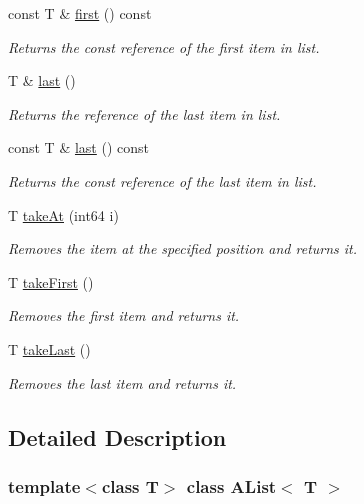 \begin{DoxyCompactItemize}
const T \& \mbox{\hyperlink{class_a_list_a1cf9c09ee90e96a5f72a39344f8240be}{first}} () const
\begin{DoxyCompactList}\small\item\em Returns the const reference of the first item in list. \end{DoxyCompactList}\item 
T \& \mbox{\hyperlink{class_a_list_a41b07290930bbfa06ec02f9106a52b74}{last}} ()
\begin{DoxyCompactList}\small\item\em Returns the reference of the last item in list. \end{DoxyCompactList}\item 
const T \& \mbox{\hyperlink{class_a_list_ab6c0fc542c318f68199ef3b4d97c82f4}{last}} () const
\begin{DoxyCompactList}\small\item\em Returns the const reference of the last item in list. \end{DoxyCompactList}\item 
T \mbox{\hyperlink{class_a_list_a626da346e2e3fdbc42f14fa11926f79c}{take\+At}} (int64 i)
\begin{DoxyCompactList}\small\item\em Removes the item at the specified position and returns it. \end{DoxyCompactList}\item 
T \mbox{\hyperlink{class_a_list_af2da906ed8c9bf282fc9f6f726864d9f}{take\+First}} ()
\begin{DoxyCompactList}\small\item\em Removes the first item and returns it. \end{DoxyCompactList}\item 
T \mbox{\hyperlink{class_a_list_aa210fddef3bf64dd63dd68f3d5f2fe05}{take\+Last}} ()
\begin{DoxyCompactList}\small\item\em Removes the last item and returns it. \end{DoxyCompactList}\end{DoxyCompactItemize}


\subsection{Detailed Description}
\subsubsection*{template$<$class T$>$\newline
class A\+List$<$ T $>$}

